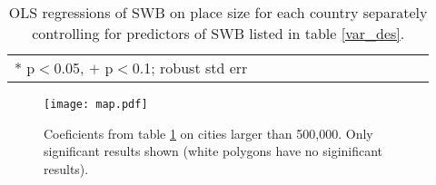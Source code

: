 \documentclass[11pt, letterpaper]{article}
\begin{document}
\begin{spacing}{.9} \begin{table}[H]\centering   \begin{scriptsize} \begin{tabular}{p{.5in}p{.5in}p{.5in}p{.5in}p{.5in}p{.5in}p{.5in}p{.5in}p{.5in}p{.5in}p{.5 in}p{.5in}p{.5 in}}\hline  \hline * p$<$0.05, $+$ p$<$0.1; robust std err \end{tabular}\end{scriptsize}\caption{\label{regression}OLS regressions of SWB on place size for each country separately controlling for predictors of SWB listed in table \ref{var_des}.%
}\end{table} \end{spacing}

\begin{figure}[H]
\begin{centering}
 \texttt{[image: map.pdf]}
 \caption{Coeficients from table \ref{regression} on cities larger than
   500,000. Only significant results shown (white polygons have no siginificant results).} \label{map}
  \end{centering}
\end{figure}

\end{document}
